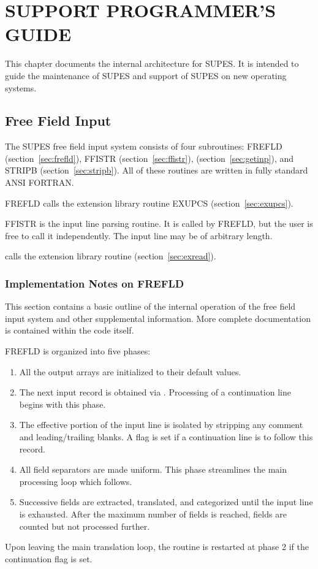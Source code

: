 \chapter{SUPPORT PROGRAMMER'S GUIDE} \label{sec:support}
This chapter documents the internal architecture for SUPES.  It is intended
to guide the maintenance of SUPES and support of SUPES on new operating
systems.

\section{Free Field Input} The SUPES free field input system consists of
four subroutines: FREFLD (section~\ref{sec:frefld}),
FFISTR (section~\ref{sec:ffistr}), 
(section~\ref{sec:getinp}), and STRIPB (section~\ref{sec:stripb}). All of
these routines are written in fully standard ANSI FORTRAN.

FREFLD calls the extension library routine EXUPCS
(section~\ref{sec:exupcs}). 

FFISTR is the input line parsing routine.  It is called by FREFLD, but
the user is free to call it independently.  The input line may be of
arbitrary length.

 calls the extension library routine 
(section~\ref{sec:exread}). 


\subsection{Implementation Notes on FREFLD}

This section contains a basic outline of the internal operation of the free
field input system and other supplemental information.  More complete
documentation is contained within the code itself.

FREFLD is organized into five phases:
\begin{enumerate}
\item All the output arrays are initialized to their default values.

\item The next input record is obtained via .  Processing of a
        continuation line begins with this phase.

\item The effective portion of the input line is isolated by stripping any
        comment and leading/trailing blanks.  A flag is set if a
        continuation line is to follow this record.

\item All field separators are made uniform.  This phase streamlines the
        main processing loop which follows.

\item Successive fields are extracted, translated, and categorized until
        the input line is exhausted.  After the maximum number of fields is
        reached, fields are counted but not processed further.
\end{enumerate}
Upon leaving the main translation loop, the routine is restarted at phase 2
if the continuation flag is set.

